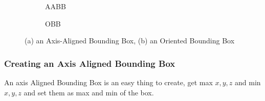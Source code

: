 			\begin{figure}[H]
				\centering
				\begin{subfigure}{.5\textwidth}
					\centering
					\caption{AABB}
					\label{fig:AABB}
				\end{subfigure}%
				\begin{subfigure}{.5\textwidth}
					\centering
					\caption{OBB}
					\label{fig:OBB}
				\end{subfigure}
				\caption{(a) an Axis-Aligned Bounding Box, (b) an Oriented Bounding Box}
			\end{figure}
			
			\subsubsection{Creating an Axis Aligned Bounding Box}
			An axis Aligned Bounding Box is an easy thing to create, get max $x,y,z$ and min $x,y,z$  and set them as max and min of the box.
			
